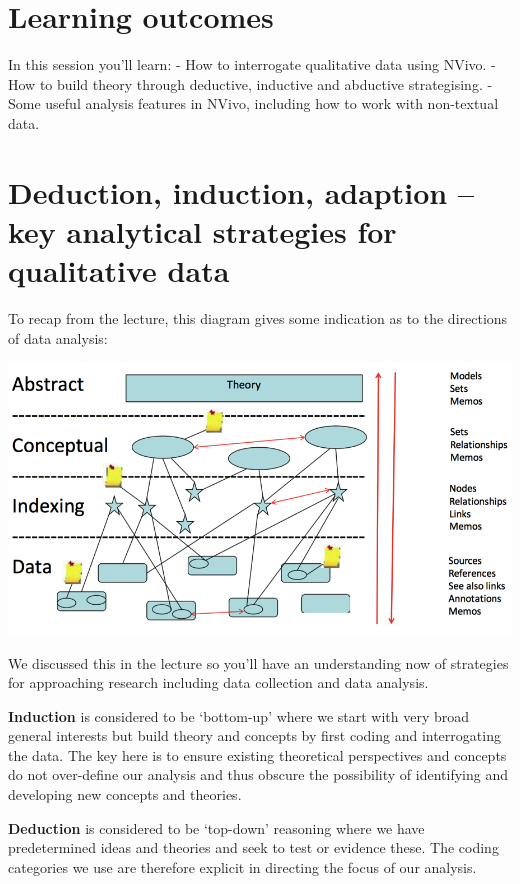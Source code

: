 \documentclass[]{book}
\theoremstyle{definition}
\theoremstyle{definition}
\theoremstyle{definition}
\theoremstyle{remark}
\begin{document}
\hypertarget{learning-outcomes-8}{%
\section{Learning outcomes}\label{learning-outcomes-8}}

In this session you'll learn: - How to interrogate qualitative data
using NVivo. - How to build theory through deductive, inductive and
abductive strategising. - Some useful analysis features in NVivo,
including how to work with non-textual data.

\hypertarget{deduction-induction-adaption-key-analytical-strategies-for-qualitative-data}{%
\section{Deduction, induction, adaption -- key analytical strategies for
qualitative
data}\label{deduction-induction-adaption-key-analytical-strategies-for-qualitative-data}}

To recap from the lecture, this diagram gives some indication as to the
directions of data analysis:

\includegraphics{imgs/qual_31.png}

We discussed this in the lecture so you'll have an understanding now of
strategies for approaching research including data collection and data
analysis.

\textbf{Induction} is considered to be `bottom-up' where we start with
very broad general interests but build theory and concepts by first
coding and interrogating the data. The key here is to ensure existing
theoretical perspectives and concepts do not over-define our analysis
and thus obscure the possibility of identifying and developing new
concepts and theories.

\textbf{Deduction} is considered to be `top-down' reasoning where we
have predetermined ideas and theories and seek to test or evidence
these. The coding categories we use are therefore explicit in directing
the focus of our analysis.
\end{document}
